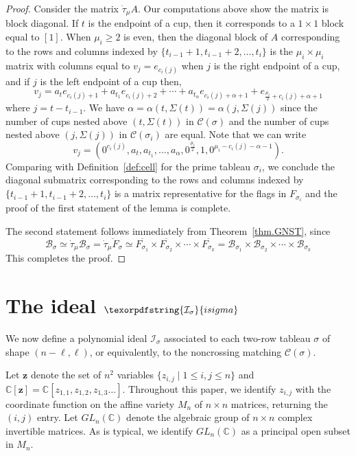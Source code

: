 \documentclass[11pt]{amsart}
\theoremstyle{remark}
\theoremstyle{remark}
\theoremstyle{definition}
\theoremstyle{definition}
\theoremstyle{definition}
\numberwithin{equation}{section}
\newcommand{\C}{\mathbb{C}}           %
\newcommand{\ga}{\alpha}
\newcommand{\gs}{\sigma}
\newcommand{\cc}{\mathcal{C}}
\newcommand{\ci}{\mathcal{I}}
\newcommand{\SF}{\mathcal{B}}
\newcommand{\E}{\Sigma}
\newcommand{\cupsigma}{\cc(\gs)}
\newcommand{\isigma}{\ci_\gs}
\newcommand{\parsum}{t}
\begin{document}
\begin{proof}
Consider the matrix $\dot\tau_\mu A$. Our computations above show the matrix is block diagonal. If $t$ is the endpoint of a cup, then it corresponds to a $1\times 1$ block equal to $[1]$. When $\mu_i\geq 2$ is even, then the diagonal block of $A$ corresponding to the rows and columns indexed by $\{\parsum_{i-1}+1, \parsum_{i-1}+2, \ldots, \parsum_i\}$ is the $\mu_i\times \mu_i$ matrix with columns equal to $v_j = e_{c_i(j)}$ when $j$ is the right endpoint of a cup, and if $j$ is the left endpoint of a cup then, 
\[
v_j = a_t e_{c_i(j)+1} + a_{t_1}e_{c_i(j)+2}+\cdots + a_{t_\ga}e_{c_i(j)+\ga+1}+ e_{\frac{\mu_i}{2} + c_i(j)+\ga+1}
\]
where $j=t-\parsum_{i-1}$. We have $\ga = \ga(t,\E(t)) = \ga(j, \E(j))$ since the number of cups nested above $(t,\E(t))$ in $\cupsigma$ and the number of cups nested above $(j,\E(j))$ in $\cc(\gs_i)$ are equal. Note that we can write
\[
v_j = (0^{c_i(j)}, a_t, a_{t_1}, \ldots, a_{\ga}, 0^{\frac{\mu_i}{2}}, 1, 0^{\mu_i - c_i(j) - \ga -1}).
\]
Comparing with Definition~\ref{def:cell} for the prime tableau $\gs_i$, we conclude the diagonal submatrix corresponding to the rows and columns indexed by $\{\parsum_{i-1}+1, \parsum_{i-1}+2, \ldots, \parsum_i\}$  is a matrix representative for the flags in $F_{\gs_i}$ and the proof of the first statement of the lemma is complete.

The second statement follows immediately from Theorem~\ref{thm.GNST}, since
\[
\SF_\gs \simeq \dot \tau_\mu \SF_\gs = \overline{\dot\tau_\mu F_\gs} \simeq \overline{F_{\gs_1}} \times \overline{F_{\gs_2}} \times \cdots \times \overline{F_{\gs_k}}  = \SF_{\gs_1}\times \SF_{\gs_2}\times \cdots \times \SF_{\gs_k}   
\]
This completes the proof. 
\end{proof}











 
\section{The ideal $\texorpdfstring{\isigma}{isigma}$}\label{sec:IdealIsig}

We now define a polynomial ideal $\isigma$ associated to each two-row tableau $\gs$ of shape $(n-\ell, \ell)$, or equivalently, to the noncrossing matching $\cupsigma$. 

Let $\mathbf{z}$ denote the set of $n^2$ variables  $\{z_{i,j}\mid 1\leq i,j\leq n\}$ and $\C[\mathbf{z}] = \C[z_{1,1},z_{1,2}, z_{1,3} \ldots]$. Throughout this paper, we identify $z_{i,j}$ with the coordinate function on the affine variety $M_n$ of $n\times n$ matrices, returning the $(i,j)$ entry.  Let $GL_n(\C)$ denote the algebraic group of $n\times n$ complex invertible matrices.  As is typical, we identify $GL_n(\C)$ as a principal open subset in $M_n$.
\end{document}
